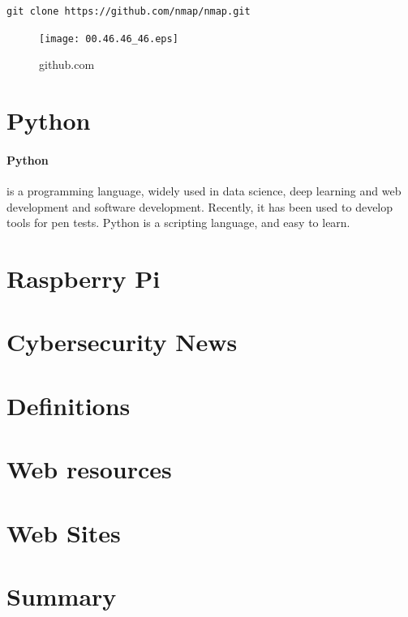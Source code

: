\documentclass[7x9]{times}
\begin{document}
\verb|git clone https://github.com/nmap/nmap.git|


\begin{center}
	\begin{figure}[ht]
		\texttt{[image: 00.46.46\_46.eps]}
		\caption{github.com}
	\end{figure}
\end{center}



\section{Python}

\paragraph{Python} is a programming language, widely used in data science, deep learning and web development and software development. Recently, it has been used to develop tools for pen tests. Python is a scripting language, and easy to learn.



\section{Raspberry Pi}

\section{Cybersecurity News}

\section{Definitions}

\section{Web resources}


\section{Web Sites}

\section{Summary}
\end{document}
